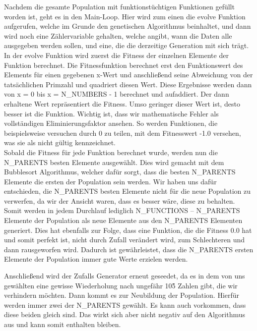 \documentclass[a4paper,12pt]{article}
\begin{document}
Nachdem die gesamte Population mit funktionstüchtigen Funktionen gefüllt worden ist, geht es in den Main-Loop. Hier wird zum einen die evolve Funktion aufgerufen, welche im Grunde den genetischen Algorithmus beinhaltet, und dann wird noch eine Zählervariable gehalten, welche angibt, wann die Daten alle ausgegeben werden sollen, und eine, die die derzeitige Generation mit sich trägt.\\

In der evolve Funktion wird zuerst die Fitness der einzelnen Elemente der Funktion berechnet. Die Fitnessfunktion berechnet erst den Funktionswert des Elements für einen gegebenen x-Wert und anschließend seine Abweichung von der tatsächlichen Primzahl und quadriert diesen Wert. Diese Ergebnisse werden dann von x = 0 bis x = N\_NUMBERS - 1 berechnet und aufaddiert. Der dann erhaltene Wert repräsentiert die Fitness. Umso geringer dieser Wert ist, desto besser ist die Funktion. Wichtig ist, dass wir mathematische Fehler als vollständigen Eliminierungsfaktor ansehen. So werden Funktionen, die beispielsweise versuchen durch 0 zu teilen, mit dem Fitnesswert -1.0 versehen, was sie als nicht gültig kennzeichnet. \\

Sobald die Fitness für jede Funktion berechnet wurde, werden nun die N\_PARENTS besten Elemente ausgewählt. Dies wird gemacht mit dem Bubblesort Algorithmus, welcher dafür sorgt, dass die besten N\_PARENTS Elemente die ersten der Population sein werden. 
Wir haben uns dafür entschieden, die N\_PARENTS besten Elemente nicht für die neue Population zu verwerfen, da wir der Ansicht waren, dass es besser wäre, diese zu behalten. Somit werden in jedem Durchlauf lediglich N\_FUNCTIONS – N\_PARENTS Elemente der Population als neue Elemente aus den N\_PARENTS Elementen generiert. Dies hat ebenfalls zur Folge, dass eine Funktion, die die Fitness 0.0 hat und somit perfekt ist, nicht durch Zufall verändert wird, zum Schlechteren und dann rausgeworfen wird. Dadurch ist gewährleistet, dass die N\_PARENTS ersten Elemente der Population immer gute Werte erzielen werden. 

Anschließend wird der Zufalls Generator erneut geseedet, da es in dem von uns gewählten eine gewisse Wiederholung nach ungefähr 10\^5 Zahlen gibt, die wir verhindern möchten. Dann kommt es zur Neubildung der Population. Hierfür werden immer zwei der N\_PARENTS gewählt. Es kann auch vorkommen, dass diese beiden gleich sind. Das wirkt sich aber nicht negativ auf den Algorithmus aus und kann somit enthalten bleiben. 
\end{document}
